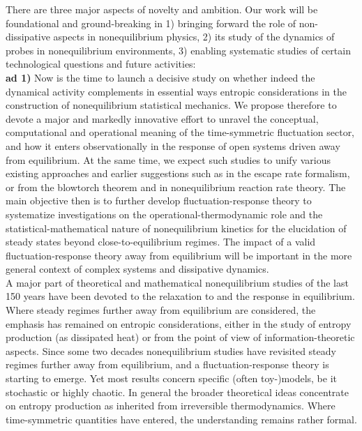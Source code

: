 
There are three major aspects of novelty and ambition.  Our work will be foundational and ground-breaking in 1) bringing forward the role of non-dissipative aspects in nonequilibrium physics, 2) its study of the dynamics of probes in nonequilibrium environments, 3) enabling systematic studies of certain technological questions and future activities:\\
{\bf ad 1)} Now is the time to launch a decisive study on whether indeed the dynamical activity complements in essential ways entropic considerations in the construction of nonequilibrium statistical  mechanics. We propose therefore to devote a major and markedly innovative effort to unravel the conceptual, computational and operational meaning of the time-symmetric fluctuation sector, and how it enters observationally in the response of open systems driven away from equilibrium. At the same time, we expect such studies to unify various existing approaches and earlier suggestions such as in the escape rate formalism, or from the blowtorch theorem and in nonequilibrium reaction rate theory. The main objective then is to further develop fluctuation-response theory to systematize investigations on the operational-thermodynamic role and the statistical-mathematical nature of nonequilibrium kinetics for the elucidation of steady states beyond close-to-equilibrium regimes. The impact of a valid fluctuation-response theory away from equilibrium will be important in the more general context of complex systems and dissipative dynamics.\\
A major part of theoretical and mathematical nonequilibrium studies of the last 150 years have been devoted to the relaxation to and the response in equilibrium. Where steady regimes further away from equilibrium are considered, the emphasis has remained on entropic considerations, either in the study of entropy production (as dissipated heat) or from the point of view of information-theoretic aspects.
Since some two decades nonequilibrium studies have revisited steady regimes further away from equilibrium, and a fluctuation-response theory is starting to emerge. Yet most results concern specific (often toy-)models, be it stochastic or highly chaotic. In general the broader theoretical ideas concentrate on entropy production as inherited from irreversible thermodynamics. Where time-symmetric quantities have entered, the understanding remains rather formal.
